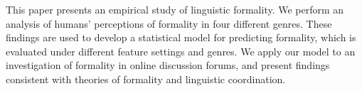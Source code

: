 This paper presents an empirical study of linguistic formality. We perform an analysis of humans' perceptions of formality in four different genres. These findings are used to develop a statistical model for predicting formality, which is evaluated under different feature settings and genres. We apply our model to an investigation of formality in online discussion forums, and present findings consistent with theories of formality and linguistic coordination.
